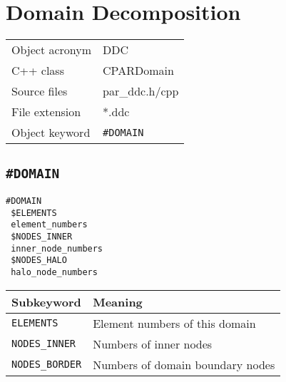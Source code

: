\section{Domain Decomposition}

\begin{tabular*}{5.35cm}{|p{2.5cm}|p{2cm}|} \hline
Object acronym & DDC \\
C++ class  & CPARDomain \\
Source files   & par\_ddc.h/cpp \\
\hline
File extension & *.ddc\\
Object keyword &  {\texttt{\#DOMAIN}} \\
\hline
\end{tabular*}


\subsection{\bf\texttt{\#DOMAIN}}

\begin{verbatim}
#DOMAIN
 $ELEMENTS
 element_numbers
 $NODES_INNER
 inner_node_numbers
 $NODES_HALO
 halo_node_numbers
\end{verbatim}

\begin{tabular*}{12.773cm}{|p{}|p{8.9cm}|} \hline
Subkeyword         & Meaning \\ \hline \hline
%
\texttt{ELEMENTS}    & Element numbers of this domain \\
\texttt{NODES\_INNER}& Numbers of inner nodes \\
\texttt{NODES\_BORDER} & Numbers of domain boundary nodes \\
\hline
\end{tabular*}


